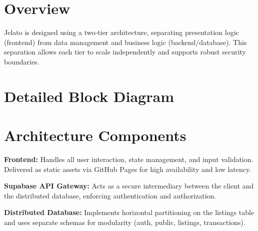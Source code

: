 \documentclass[12pt,a4paper]{report}
\begin{document}
\section{Overview}
Jelato is designed using a two-tier architecture, separating presentation logic (frontend) from data management and business logic (backend/database). This separation allows each tier to scale independently and supports robust security boundaries.

\section{Detailed Block Diagram}
\begin{center}
\end{center}

\section{Architecture Components}
\textbf{Frontend:} Handles all user interaction, state management, and input validation. Delivered as static assets via GitHub Pages for high availability and low latency.

\textbf{Supabase API Gateway:} Acts as a secure intermediary between the client and the distributed database, enforcing authentication and authorization.

\textbf{Distributed Database:} Implements horizontal partitioning on the listings table and uses separate schemas for modularity (auth, public, listings, transactions).
\end{document}
